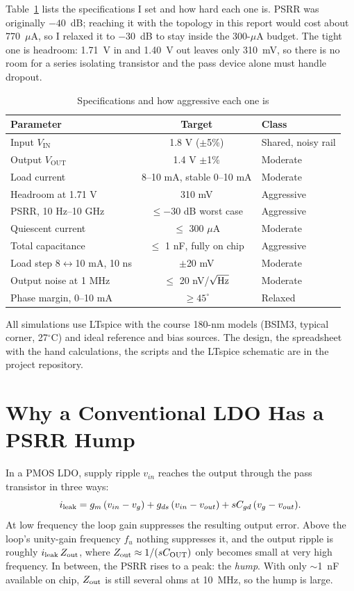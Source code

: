 \documentclass[conference]{IEEEtran}
\newcommand{\Vin}{V_{\mathrm{IN}}}\newcommand{\Vout}{V_{\mathrm{OUT}}}
\newcommand{\Cout}{C_{\mathrm{OUT}}}\newcommand{\Cgd}{C_{gd}}
\begin{document}
Table~\ref{tab:specs} lists the specifications I set and how hard each one is. PSRR was originally $-40$~dB; reaching it with the topology in this report would cost about 770~$\mu$A, so I relaxed it to $-30$~dB to stay inside the 300-$\mu$A budget. The tight one is headroom: 1.71~V in and 1.40~V out leaves only 310~mV, so there is no room for a series isolating transistor and the pass device alone must handle dropout.

\begin{table}[!t]
\centering
\caption{Specifications and how aggressive each one is}
\label{tab:specs}
\footnotesize
\begin{tabular}{@{}lcl@{}}
\toprule
Parameter & Target & Class \\
\midrule
Input $\Vin$ & 1.8 V ($\pm$5\%) & Shared, noisy rail \\
Output $\Vout$ & 1.4 V $\pm$1\% & Moderate \\
Load current & 8--10 mA, stable 0--10 mA & Moderate \\
Headroom at 1.71 V & 310 mV & Aggressive \\
PSRR, 10 Hz--10 GHz & $\le -30$ dB worst case & Aggressive \\
Quiescent current & $\le$ 300 $\mu$A & Moderate \\
Total capacitance & $\le$ 1 nF, fully on chip & Aggressive \\
Load step 8$\leftrightarrow$10 mA, 10 ns & $\pm$20 mV & Moderate \\
Output noise at 1 MHz & $\le$ 20 nV/$\sqrt{\rm Hz}$ & Moderate \\
Phase margin, 0--10 mA & $\ge 45^\circ$ & Relaxed \\
\bottomrule
\end{tabular}
\end{table}

All simulations use LTspice with the course 180-nm models (BSIM3, typical corner, 27$^\circ$C) and ideal reference and bias sources. The design, the spreadsheet with the hand calculations, the scripts and the LTspice schematic are in the project repository.

\section{Why a Conventional LDO Has a PSRR Hump}
In a PMOS LDO, supply ripple $v_{in}$ reaches the output through the pass transistor in three ways:
\begin{equation}
i_{\rm leak} = g_m\,(v_{in}-v_g) + g_{ds}\,(v_{in}-v_{out}) + sC_{gd}\,(v_g-v_{out}).
\label{eq:leak}
\end{equation}
At low frequency the loop gain suppresses the resulting output error. Above the loop's unity-gain frequency $f_u$ nothing suppresses it, and the output ripple is roughly $i_{\rm leak}\,Z_{\rm out}$, where $Z_{\rm out}\approx 1/(s\Cout)$ only becomes small at very high frequency. In between, the PSRR rises to a peak: the \emph{hump}. With only $\sim$1~nF available on chip, $Z_{\rm out}$ is still several ohms at 10~MHz, so the hump is large.
\end{document}
